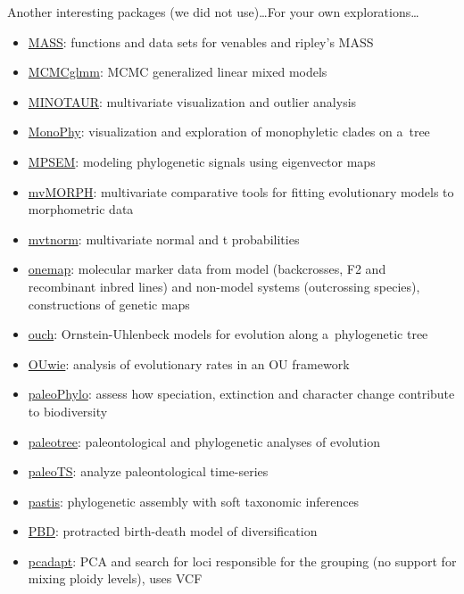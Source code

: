 \documentclass[compress, ucs, xelatex, 11pt, xcolor=svgnames,
	hyperref={
		bookmarks=true,
		unicode=true,
		colorlinks=true,
		pdftitle={Molecular data in R},
		plainpages=false,
		pdfauthor={Vojtech Zeisek},
		pdfsubject={Course about phylogeny and evolution in R},
		pdfcreator={XeLaTeX},
		pdfkeywords={R, evolution, phylogeny, molecular data},
		linkcolor=Tomato,
		anchorcolor=SaddleBrown,
		citecolor=Goldenrod,
		filecolor=DarkMagenta,
		menucolor=Sienna,
		urlcolor=DarkTurquoise,
		pdftex},
	url={hyphens, lowtilde} %
	]{beamer}
\begin{document}
\begin{frame}[allowframebreaks]{Another interesting packages (we did not use)\ldots}{For your own explorations\ldots}
\begin{itemize}
		\item \href{https://CRAN.R-project.org/package=MASS}{MASS}: functions and data sets for venables and ripley's MASS
		\item \href{https://CRAN.R-project.org/package=MCMCglmm}{MCMCglmm}: MCMC generalized linear mixed models
		\item \href{https://github.com/NESCent/MINOTAUR}{MINOTAUR}: multivariate visualization and outlier analysis
		\item \href{https://CRAN.R-project.org/package=MonoPhy}{MonoPhy}: visualization and exploration of monophyletic clades on a~tree
		\item \href{https://CRAN.R-project.org/package=MPSEM}{MPSEM}: modeling phylogenetic signals using eigenvector maps
		\item \href{https://CRAN.R-project.org/package=mvMORPH}{mvMORPH}: multivariate comparative tools for fitting evolutionary models to morphometric data
		\item \href{https://CRAN.R-project.org/package=mvtnorm}{mvtnorm}: multivariate normal and t probabilities
		\item \href{https://CRAN.R-project.org/package=onemap}{onemap}: molecular marker data from model (backcrosses, F2 and recombinant inbred lines) and non-model systems (outcrossing species), constructions of genetic maps
		\item \href{https://CRAN.R-project.org/package=ouch}{ouch}: Ornstein-Uhlenbeck models for evolution along a~phylogenetic tree
		\item \href{https://CRAN.R-project.org/package=OUwie}{OUwie}: analysis of evolutionary rates in an OU framework
		\item \href{https://r-forge.r-project.org/projects/paleophylo/}{paleoPhylo}: assess how speciation, extinction and character change contribute to biodiversity
		\item \href{https://CRAN.R-project.org/package=paleotree}{paleotree}: paleontological and phylogenetic analyses of evolution
		\item \href{https://CRAN.R-project.org/package=paleoTS}{paleoTS}: analyze paleontological time-series
		\item \href{https://CRAN.R-project.org/package=pastis}{pastis}: phylogenetic assembly with soft taxonomic inferences
		\item \href{https://CRAN.R-project.org/package=PBD}{PBD}: protracted birth-death model of diversification
		\item \href{https://CRAN.R-project.org/package=pcadapt}{pcadapt}: PCA and search for loci responsible for the grouping (no support for mixing ploidy levels), uses VCF

\end{itemize}
\end{frame}
\end{document}
